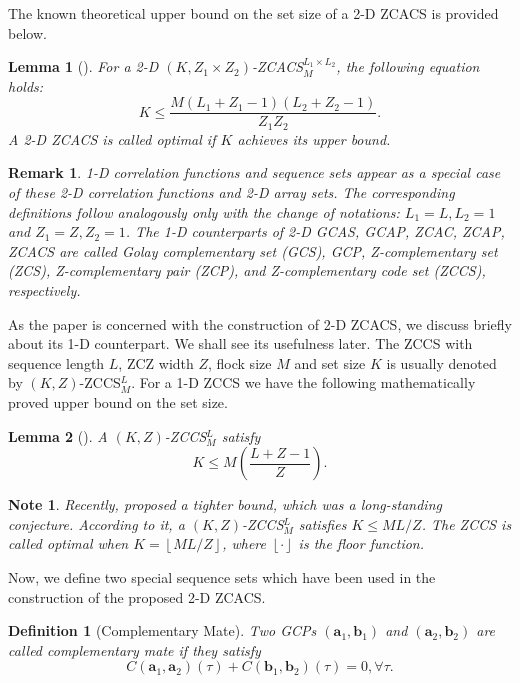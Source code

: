 \documentclass[pdflatex,sn-mathphys-num]{sn-jnl}%
\theoremstyle{thmstyleone}
\newtheorem{defn}{Definition}
\newtheorem{lemma}{Lemma}
\newtheorem{remark}{Remark}
\newtheorem{note}{Note}
\newcommand{\floor}[1]{\left\lfloor #1 \right\rfloor}
\begin{document}
	The known theoretical upper bound on the set size of a 2-D ZCACS is provided below.
	\begin{lemma} [\cite{ZengZCACS2}]\label{lemma_ZCACS_bound}
		For a 2-D $(K, Z_1 \times Z_2)$-ZCACS${}_{M}^{L_1 \times L_2}$,  the following equation holds:
		\begin{equation}
			K  \leq \frac{ M (L_1 + Z_1 -1) (L_2 + Z_2 -1) } {Z_1 Z_2}.
		\end{equation}
		A 2-D ZCACS is called optimal if $K$ achieves its upper bound.
	\end{lemma}
	
	\begin{remark}\label{remark_2D_1D}
		1-D correlation functions and sequence sets appear as a special case of these 2-D correlation functions and 2-D array sets. The corresponding definitions follow analogously only with the change of notations: $L_1=L, L_2=1$ and $Z_1=Z, Z_2=1$. The 1-D counterparts of 2-D GCAS, GCAP, ZCAC, ZCAP, ZCACS are called Golay complementary set (GCS), GCP, Z-complementary set (ZCS), Z-complementary pair (ZCP),  and Z-complementary code set (ZCCS), respectively.
	\end{remark}
	
	
	As the paper is concerned with the construction of 2-D ZCACS, we discuss briefly about its 1-D counterpart. We shall see its usefulness later.  The ZCCS with sequence length $L$, ZCZ width $Z$, flock size $M$ and set size $K$ is usually denoted by $(K, Z)$-ZCCS${}_{M}^{L}$. For a 1-D ZCCS we have the following mathematically proved upper bound on the set size.
	\begin{lemma} [\cite{FengZCCSbound}]\label{lemma_ZCCS_bound}
		A $(K, Z)$-ZCCS${}_{M}^{L}$ satisfy
		\begin{equation}
			K  \leq M \left(\frac{L+Z-1}{Z} \right).
		\end{equation}
	\end{lemma}
	
	\begin{note}
		Recently, \cite{pai2024ZCCSbound} proposed a tighter bound, which was a long-standing conjecture. According to it, a $(K, Z)$-ZCCS${}_{M}^{L}$ satisfies  $K \leq ML/Z$. The ZCCS is called optimal when $K = \floor{ML/Z}$, where $\floor{\cdot}$ is the floor function.
	\end{note}
	
	Now, we define two special sequence sets which have been used in the construction of the proposed 2-D ZCACS.
	
	\begin{defn}[Complementary Mate]
		Two GCPs $(\mathbf{a}_1, \mathbf{b}_1)$ and $(\mathbf{a}_2, \mathbf{b}_2)$ are called complementary mate if they satisfy
		\begin{equation}
			C (\mathbf{a}_1, \mathbf{a}_2) (\tau)+ C (\mathbf{b}_1, \mathbf{b}_2)(\tau)= 0, \forall \tau.
		\end{equation}
	\end{defn}
	
\end{document}
